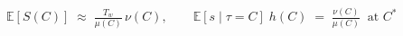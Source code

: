 \documentclass[border=2pt]{standalone}
\begin{document}
$\displaystyle \mathbb{E}[S(C)] \;\approx\; \frac{T_w}{\mu(C)}\,\nu(C), \qquad \mathbb{E}[s \mid \tau = C]\;h(C) \;=\; \frac{\nu(C)}{\mu(C)} \;\;\text{at } C^\ast$
\end{document}

